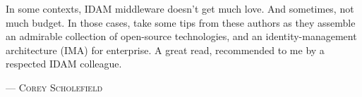 In some contexts, IDAM middleware doesn't get much love. And sometimes, not much budget. In those cases, take some tips from these authors as they assemble an admirable collection of open-source technologies, and an identity-management architecture (IMA) for enterprise. A great read, recommended to me by a respected IDAM colleague.
\setlength{\parindent}{0cm}\par\textsc{ --- Corey Scholefield }\par\vspace{12pt}\setlength{\parindent}{15pt}
